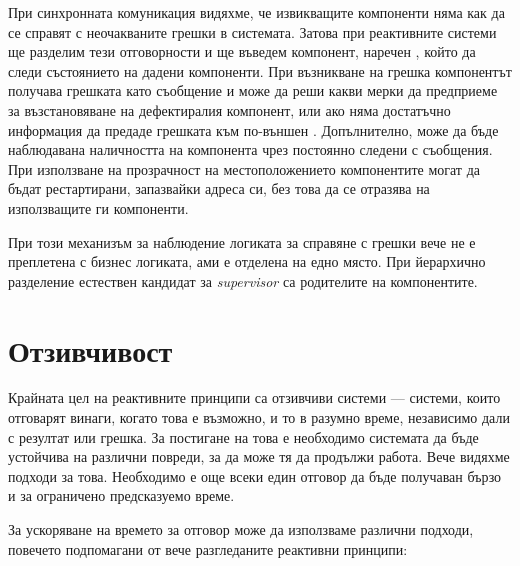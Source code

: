 При синхронната комуникация видяхме, че извикващите компоненти няма как да се справят с неочакваните грешки в системата. Затова при реактивните системи ще разделим тези отговорности и ще въведем компонент, наречен , който да следи състоянието на дадени компоненти. При възникване на грешка  компонентът получава грешката като съобщение и може да реши какви мерки да предприеме за възстановяване на дефектиралия компонент, или ако няма достатъчно информация да предаде грешката към по-външен . Допълнително, може да бъде наблюдавана наличността на компонента чрез постоянно следени с  съобщения. При използване на прозрачност на местоположението компонентите могат да бъдат рестартирани, запазвайки адреса си, без това да се отразява на използващите ги компоненти.

При този механизъм за наблюдение логиката за справяне с грешки вече не е преплетена с бизнес логиката, ами е отделена на едно място. При йерархично разделение естествен кандидат за \emph{supervisor} са родителите на компонентите.

\section{Отзивчивост}
\label{sec:responsive}

Крайната цел на реактивните принципи са отзивчиви системи — системи, които отговарят винаги, когато това е възможно, и то в разумно време, независимо дали с резултат или грешка. За постигане на това е необходимо системата да бъде устойчива на различни повреди, за да може тя да продължи работа. Вече видяхме подходи за това. Необходимо е още всеки един отговор да бъде получаван бързо и за ограничено предсказуемо време.

За ускоряване на времето за отговор може да използваме различни подходи, повечето подпомагани от вече разгледаните реактивни принципи:

